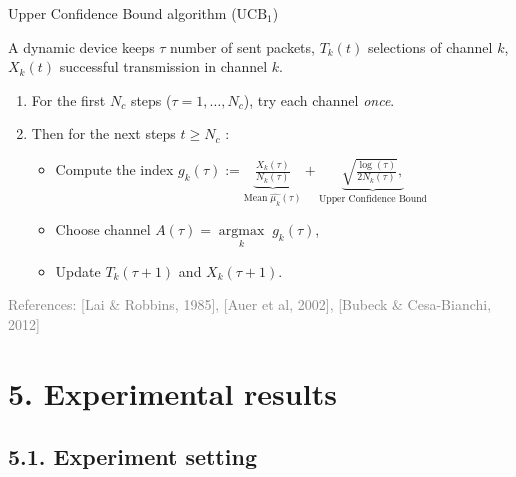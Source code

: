 \documentclass[12pt,english,ignorenonframetext,aspectratio=169,]{beamer}
\providecommand{\tightlist}{%
  \setlength{\itemsep}{0pt}\setlength{\parskip}{0pt}}
\begin{document}
\begin{frame}{Upper Confidence Bound algorithm (\(\mathrm{UCB}_1\))}

A dynamic device keeps \(\tau\) number of sent packets, \(T_k(t)\)
selections of channel \(k\), \(X_k(t)\) successful transmission in
channel \(k\).

\begin{enumerate}
\def\labelenumi{\arabic{enumi}.}
\tightlist
\item
  For the first \(N_c\) steps (\(\tau=1,\dots,N_c\)), try each channel
  \emph{once}.
\item
  Then for the next steps \(t \geq N_c\) :

  \begin{itemize}
  \tightlist
  \item
    Compute the index
    \(g_k(\tau) := \underbrace{\frac{X_k(\tau)}{N_k(\tau)}}_{\text{Mean}\; \widehat{\mu_k}(\tau)} + \underbrace{\sqrt{\frac{\log(\tau)}{2 N_k(\tau)}},}_{\text{Upper Confidence Bound}}\)
  \item
    Choose channel
    \(A(\tau) = \mathop{\arg\max}\limits_{k} \; g_k(\tau)\),
  \item
    Update \(T_k(\tau+1)\) and \(X_k(\tau+1)\).
  \end{itemize}
\end{enumerate}

\vfill{}\hfill{}\tiny{\textcolor{gray}{References: [Lai \& Robbins, 1985], [Auer et al, 2002], [Bubeck \& Cesa-Bianchi, 2012]}}

\end{frame}



\section{\hfill{}5. Experimental results\hfill{}}

\subsection{\hfill{}5.1. Experiment setting\hfill{}}
\end{document}
